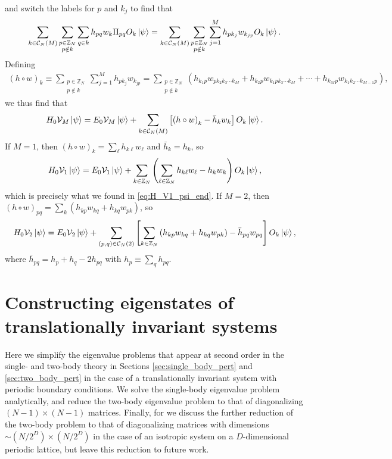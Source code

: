 \documentclass[nofootinbib,notitlepage,11pt]{revtex4-2}
\newcommand{\p}[1]{\left(#1\right)} %
\renewcommand{\sp}[1]{\left[#1\right]} %
\newcommand{\1}{\mathds{1}}
\newcommand{\C}{\mathcal{C}}
\newcommand{\V}{\mathcal{V}}
\newcommand{\ZZ}{\mathbb{Z}}
\begin{document}
and switch the labels for $p$ and $k_j$ to find that
\begin{align}
  \sum_{k\in\C_N\p{M}} \sum_{\substack{p\in\ZZ_N\\p\notin k}} \sum_{q\in k}
  h_{pq} w_k  \Pi_{pq} O_k \ket\psi
  = \sum_{k\in\C_N\p{M}} \sum_{\substack{p\in\ZZ_N\\p\notin k}}
  \sum_{j=1}^M h_{pk_j} w_{k_{jp}} O_k \ket\psi.
\end{align}
Defining
\begin{align}
  \p{h\circ w}_k
  \equiv \sum_{\substack{p\in\ZZ_N\\p\notin k}} \sum_{j=1}^M
  h_{pk_j} w_{k_{jp}}
  = \sum_{\substack{p\in\ZZ_N\\p\notin k}}
  \p{h_{k_1 p} w_{pk_2k_3\cdots k_M}
    + h_{k_2 p} w_{k_1pk_3\cdots k_M}
    + \cdots + h_{k_M p} w_{k_1k_2\cdots k_{M-1} p}},
\end{align}
we thus find that
\begin{align}
  H_0 \V_M \ket\psi
  = E_0 \V_M \ket\psi + \sum_{k\in\C_N\p{M}}
  \sp{\p{h\circ w}_k - \bar h_k w_k} O_k \ket\psi.
\end{align}
If $M=1$, then $\p{h\circ w}_k=\sum_\ell h_{k\ell}w_\ell$ and
$\bar h_k=h_k$, so
\begin{align}
  H_0 \V_1 \ket\psi
  = E_0 \V_1 \ket\psi + \sum_{k\in\ZZ_N}
  \p{\sum_{\ell\in\ZZ_N} h_{k\ell} w_\ell - h_k w_k} O_k \ket\psi,
\end{align}
which is precisely what we found in \eqref{eq:H_V1_psi_end}.  If
$M=2$, then $\p{h\circ w}_{pq}=\sum_k\p{h_{kp} w_{kq}+h_{kq}w_{pk}}$,
so
\begin{align}
  H_0 \V_2 \ket\psi
  = E_0 \V_2 \ket\psi + \sum_{\p{p,q}\in\C_N\p{2}}
  \sp{\sum_{k\in\ZZ_N}\p{h_{kp} w_{kq} + h_{kq} w_{pk}}
    - \bar h_{pq} w_{pq}}
  O_k \ket\psi,
\end{align}
where $\bar h_{pq}=h_p+h_q-2h_{pq}$ with $h_p\equiv\sum_qh_{pq}$.

\section{Constructing eigenstates of translationally invariant
  systems}
\label{sec:trans_inv}

Here we simplify the eigenvalue problems that appear at second order
in the single- and two-body theory in Sections
\ref{sec:single_body_pert} and \ref{sec:two_body_pert} in the case of
a translationally invariant system with periodic boundary conditions.
We solve the single-body eigenvalue problem analytically, and reduce
the two-body eigenvalue problem to that of diagonalizing
$\p{N-1}\times\p{N-1}$ matrices.  Finally, for we discuss the further
reduction of the two-body problem to that of diagonalizing matrices
with dimensions $\sim\p{N/2^D}\times\p{N/2^D}$ in the case of an
isotropic system on a $D$-dimensional periodic lattice, but leave this
reduction to future work.
\end{document}
